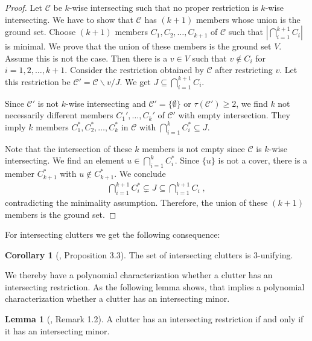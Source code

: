 \documentclass[a4paper, 12pt]{scrbook}
\theoremstyle{definition}
\newtheorem{corollary}[theorem]{Corollary}
\newtheorem{lemma}[theorem]{Lemma}
\begin{document}
   \begin{proof}
       Let $\mathcal{C}$ be $k$-wise intersecting such that no proper restriction is $k$-wise intersecting.
       We have to show that $\mathcal{C}$ has $(k+1)$ members whose union is the ground set.
       Choose $(k+1)$ members $C_1, C_2, \ldots, C_{k+1}$ of $\mathcal{C}$ such that $|\bigcap_{i=1}^{k+1} C_i|$ is minimal.
       We prove that the union of these members is the ground set $V$.
       Assume this is not the case.
       Then there is a $v \in V$ such that $v \not\in C_i$ for $i=1,2, \ldots, k+1$.
       Consider the restriction obtained by $\mathcal{C}$ after restricting $v$.
       Let this restriction be $\mathcal{C'}=\mathcal{C} \backslash v / J$.
       We get $J \subseteq \bigcap_{i=1}^{k+1} C_i$.

       Since $\mathcal{C'}$ is not $k$-wise intersecting and $\mathcal{C'}=\{\emptyset\}$ or $\tau(\mathcal{C'})\geq 2$, we find $k$ not necessarily different members $C_1',\ldots, C_k'$ of $\mathcal{C'}$ with empty intersection.
       They imply $k$ members $C_1^*, C_2^*,\ldots, C_k^*$ in $\mathcal{C}$ with $\bigcap_{i=1}^k C_i^* \subseteq J$.

       Note that the intersection of these $k$ members is not empty since $\mathcal{C}$ is $k$-wise intersecting.
       We find an element $u \in \bigcap_{i=1}^k C_i^*$. Since $\{u\}$ is not a cover, there is a member $C_{k+1}^*$ with $u \not\in C_{k+1}^*$.
       We conclude
       \begin{align*}
           \bigcap_{i=1}^{k+1} C_i^* \subsetneq J \subseteq \bigcap_{i=1}^{k+1} C_i \;,
       \end{align*}
       contradicting the minimality assumption.
       Therefore, the union of these $(k+1)$ members is the ground set.
   \end{proof}

   For intersecting clutters we get the following consequence:
   \begin{corollary}[\cite{restrictions}, Proposition 3.3]
       The set of intersecting clutters is 3-unifying.
   \end{corollary}
   We thereby have a polynomial characterization whether a clutter has an intersecting restriction. As the following lemma shows, that implies a polynomial characterization whether a clutter has an intersecting minor.

   \begin{lemma}[\cite{restrictions}, Remark 1.2]\label{intersectingminor}
       A clutter has an intersecting restriction if and only if it has an intersecting minor.
   \end{lemma}
\end{document}
